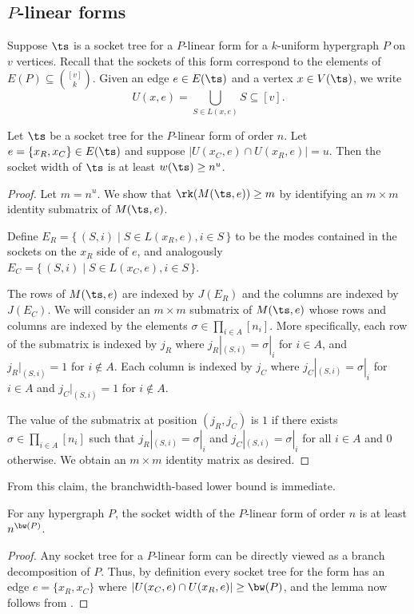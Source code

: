 %
\subsection{\texorpdfstring{$P$-linear}{P-linear} forms}

Suppose $\ts$ is a socket tree for a $P$-linear form for a $k$-uniform
hypergraph $P$ on $v$ vertices.
Recall that the sockets of this form correspond to the elements
of $E(P) \subseteq \binom{[v]}{k}$.
Given an edge $e \in E(\ts)$ and a vertex $x
\in V(\ts)$, we write \[U(x, e)=\bigcup_{S \in L(x,e)} S \subseteq [v].\]

\begin{claim}
  \label{claim:binom form sockwidth lb 1}
  Let $\ts$ be a socket tree for the $P$-linear form of order $n$.
  Let $e =
  \{x_R, x_C\} \in E(\ts)$ and suppose $|U(x_C, e) \cap U(x_R, e)|= u$.
  Then the socket width of $\ts$ is at least $w(\ts) \ge n^{u}$.

\end{claim}

\begin{proof}
  Let $m = n^u$. We show that $\rk(M(\ts, e)) \ge
  m$ by identifying an $m \times m$ identity submatrix of $M(\ts, e)$.

  Define $E_R = \{\,(S, i) \mid S \in L(x_R, e), i \in S\,\}$
  to be the modes contained in the sockets on the $x_R$ side of $e$, and analogously %
  $E_C
  = \{\,(S, i) \mid S \in L(x_C, e), i \in S\,\}$.

  The rows of $M(\ts, e)$ are indexed by $J(E_R)$ and the columns are indexed by $J(E_C)$. We will consider an $m \times m$ submatrix of $M(\ts, e)$ whose rows and columns are indexed by the elements $\sigma \in \prod_{i \in A} [n_i]$. More specifically, each row of the submatrix is indexed by $j_R$ where $j_R|_{(S,i)}=\sigma|_i$ for $i \in A$, and $j_R|_{(S,i)} = 1$ for $i \not \in A$. Each column is indexed by $j_C$ where $j_C|_{(S,i)}=\sigma|_i$ for $i \in A$ and $j_C|_{(S,i)}=1$  for $i \not \in A$.

The value of the submatrix at position $(j_{R}, j_{C})$ is $1$ if there exists $\sigma \in \prod_{i \in A} [n_i]$ such that $j_R|_{(S,i)}=\sigma|_i$ and $j_C|_{(S,i)}=\sigma|_i$ for all $i \in A$ and $0$ otherwise. We obtain
  an $m \times m$ identity matrix as desired.
\end{proof}

From this claim, the branchwidth-based lower bound is immediate.

\begin{lemma}
  \label{lem:lb-binom-2}
  For any hypergraph $P$, the socket width of the $P$-linear form
  of order $n$ is at least $n^{\bw(P)}$.
\end{lemma}
\begin{proof}
  Any socket tree for a $P$-linear form can be directly
  viewed as a branch decomposition of $P$.  Thus, by definition every
  socket tree for the form has an edge $e = \{x_R, x_C\}$ where
  $|U(x_C,e) \cap U(x_R,e)| \ge \bw(P)$, and the lemma now follows
  from .
\end{proof}

